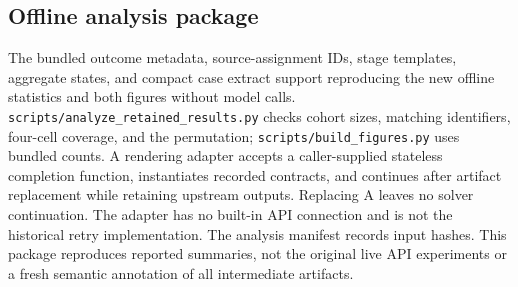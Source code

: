 \subsection{Offline analysis package}
The bundled outcome metadata, source-assignment IDs, stage templates, aggregate states, and compact case extract support reproducing the new offline statistics and both figures without model calls. \texttt{scripts/analyze\_retained\_results.py} checks cohort sizes, matching identifiers, four-cell coverage, and the permutation; \texttt{scripts/build\_figures.py} uses bundled counts. A rendering adapter accepts a caller-supplied stateless completion function, instantiates recorded contracts, and continues after artifact replacement while retaining upstream outputs. Replacing A leaves no solver continuation. The adapter has no built-in API connection and is not the historical retry implementation. The analysis manifest records input hashes. This package reproduces reported summaries, not the original live API experiments or a fresh semantic annotation of all intermediate artifacts.
